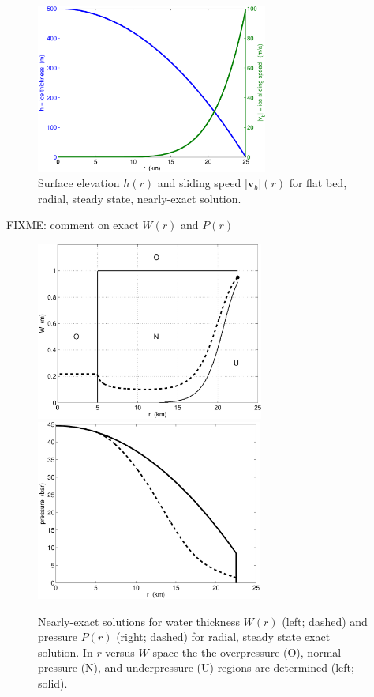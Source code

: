 \documentclass[11pt,final]{amsart}%
\newcommand\bv{\mathbf{v}}
\begin{document}
\begin{figure}[ht]
\includegraphics[width=3.0in,keepaspectratio=true]{figs/h-vb-plot}
\caption{Surface elevation $h(r)$ and sliding speed $|\bv_b|(r)$ for flat bed, radial, steady state, nearly-exact solution.}
\label{fig:h-vb}
\end{figure}

FIXME: comment on exact $W(r)$ and $P(r)$

\begin{figure}[ht]
\includegraphics[height=2.3in,keepaspectratio=true]{figs/exact-W-plot-onu} \, 
\includegraphics[height=2.33in,keepaspectratio=true]{figs/exact-P-plot}
\caption{Nearly-exact solutions for water thickness $W(r)$ (left; dashed) and pressure $P(r)$ (right; dashed) for radial, steady state exact solution.  In $r$-versus-$W$ space the the overpressure (O), normal pressure (N), and underpressure (U) regions are determined (left; solid).}
\label{fig:WPexact}
\end{figure}
\end{document}
